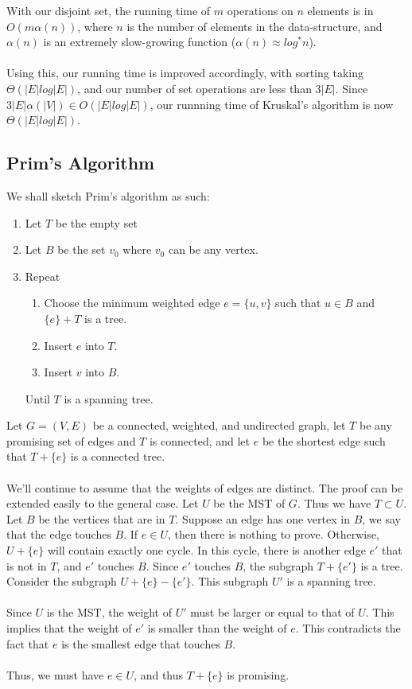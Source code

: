 \documentclass[a4paper]{article}
\begin{document}
With our disjoint set, the running time of $m$ operations on $n$ elements is in $O(m\alpha(n))$, where $n$ is the number of elements in the data-structure, and $\alpha(n)$ is an extremely slow-growing function ($\alpha(n) \approx log^*n$).\\\\
Using this, our running time is improved accordingly, with sorting taking $\Theta(|E|log|E|)$, and our number of set operations are less than $3|E|$. Since $3|E|\alpha(|V|) \in O(|E|log|E|)$, our runnning time of Kruskal's algorithm is now $\Theta(|E|log|E|)$.

\subsection{Prim's Algorithm}
We shall sketch Prim's algorithm as such:
\begin{enumerate}
	\item Let $T$ be the empty set
	\item Let $B$ be the set {$v_0$} where $v_0$ can be any vertex.
	\item Repeat
	\begin{enumerate}
		\item Choose the minimum weighted edge $e=\{u,v\}$ such that $u\in B$ and $\{e\} + T$ is a tree.
		\item Insert $e$ into $T$.
		\item Insert $v$ into $B$.
	\end{enumerate}
	Until $T$ is a spanning tree.
\end{enumerate}
Let $G=(V,E)$ be a connected, weighted, and undirected graph, let $T$ be any promising set of edges and $T$ is connected, and let $e$ be the shortest edge such that $T + \{e\}$ is a connected tree.\\\\
We'll continue to assume that the weights of edges are distinct. The proof can be extended easily to the general case. Let $U$ be the MST of $G$. Thus we have $T\subset U$. Let $B$ be the vertices that are in $T$. Suppose an edge has one vertex in $B$, we say that the edge touches $B$. If $e \in U$, then there is nothing to prove. Otherwise, $U + \{e\}$ will contain exactly one cycle. In this cycle, there is another edge $e'$ that is not in $T $, and $e'$ touches $B$. Since $e'$ touches $B$, the subgraph $T + \{e'\}$ is a tree. Consider the subgraph $U + \{e\} - \{e'\}$. This subgraph $U'$ is a spanning tree.\\\\
Since $U$ is the MST, the weight of $U'$ must be larger or equal to that of $U$. This implies that the weight of $e'$ is smaller than the weight of $e$. This contradicts the fact that $e$ is the smallest edge that touches $B$.\\\\
Thus, we must have $e\in U$, and thus $T + \{e\}$ is promising.
\end{document}
